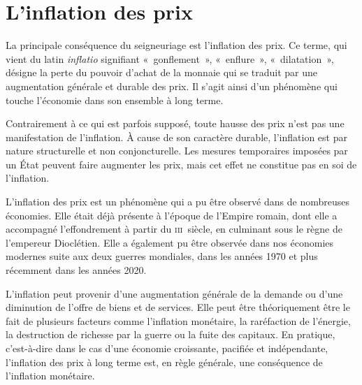 
\section*{L'inflation des prix}

La principale conséquence du seigneuriage est l'inflation des prix. Ce terme, qui vient du latin \emph{inflatio} signifiant «~gonflement~», «~enflure~», «~dilatation~», désigne la perte du pouvoir d'achat de la monnaie qui se traduit par une augmentation générale et durable des prix. Il s'agit ainsi d'un phénomène qui touche l'économie dans son ensemble à long terme.


Contrairement à ce qui est parfois supposé, toute hausse des prix n'est pas une manifestation de l'inflation. À cause de son caractère durable, l'inflation est par nature structurelle et non conjoncturelle. Les mesures temporaires imposées par un État peuvent faire augmenter les prix, mais cet effet ne constitue pas en soi de l'inflation.

L'inflation des prix est un phénomène qui a pu être observé dans de nombreuses économies. Elle était déjà présente à l'époque de l'Empire romain, dont elle a accompagné l'effondrement à partir du \textsc{iii}\ieme{}~siècle, en culminant sous le règne de l'empereur Dioclétien. Elle a également pu être observée dans nos économies modernes suite aux deux guerres mondiales, dans les années 1970 et plus récemment dans les années 2020.

L'inflation peut provenir d'une augmentation générale de la demande ou d'une diminution de l'offre de biens et de services. Elle peut être théoriquement être le fait de plusieurs facteurs comme l'inflation monétaire, la raréfaction de l'énergie, la destruction de richesse par la guerre ou la fuite des capitaux. En pratique, c'est-à-dire dans le cas d'une économie croissante, pacifiée et indépendante, l'inflation des prix à long terme est, en règle générale, une conséquence de l'inflation monétaire. %


